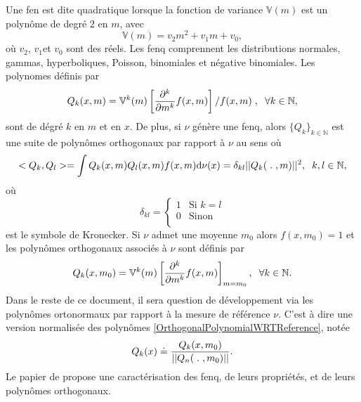 Une \gls{fen} est dite quadratique lorsque la fonction de variance $\mathbb{V}(m)$  est un polynôme de degré $2$ en $m$, avec 
\begin{equation}\label{FonctionVariance}
\mathbb{V}(m)=v_{2}m^{2}+v_{1}m+v_{0},
\end{equation}
où $v_{2}$, $v_{1}$et $v_{0}$ sont des réels. Les \gls{fenq} comprennent les distributions normales, gammas, hyperboliques, Poisson, binomiales et négative binomiales. Les polynomes définis par 
\begin{equation}\label{DefinitionPolynome}
Q_{k}(x,m)=\mathbb{V}^{k}(m)\left[\frac{\partial^{k}}{\partial m^{k}}f(x,m)\right]\left/f(x,m)\right., \hspace{0.2cm}\forall k\in \mathbb{N},
\end{equation}
sont de dégré $k$ en $m$ et en $x$. De plus, si $\nu$ génère une \gls{fenq}, alors $\{Q_{k}\}_{k\in\mathbb{N}}$ est une suite de polynômes orthogonaux par rapport à $\nu$ au sens où
\begin{equation}\label{ConditionOrthogonalitePolynome}
<Q_{k},Q_{l}>=\int Q_{k}(x,m)Q_{l}(x,m)f(x,m)\text{d}\nu(x)=\delta_{kl}||Q_{k}( \hspace{0.1cm}.\hspace{0.1cm} ,m)||^{2},\hspace{0.2cm}k,l\in\mathbb{N},
\end{equation}
où
\begin{equation} 
\delta_{kl}=
\begin{cases}
1 & \mbox{Si } k=l\\
0 & \mbox{Sinon} \\
\end{cases}
\end{equation}
est le symbole de Kronecker. Si $\nu$ admet une moyenne $m_{0}$ alors $f(x,m_{0})=1$ et les polynômes orthogonaux associés à $\nu$ sont définis par 
\begin{equation}\label{OrthogonalPolynomialWRTReference}
Q_{k}(x,m_{0})=\mathbb{V}^{k}(m)\left[\frac{\partial^{k}}{\partial m^{k}}f(x,m)\right]_{m=m_{0}}, \hspace{0.2cm}\forall k\in \mathbb{N}.
\end{equation}
Dans le reste de ce document, il sera question de développement via les polynômes ortonormaux par rapport à la mesure de référence $\nu$. C'est à dire une version normalisée des polynômes \eqref{OrthogonalPolynomialWRTReference}, notée 
\begin{equation}\label{OrthonormalPolynomialWRTReference}
Q_{k}(x)\doteq\frac{Q_{k}(x,m_{0})}{||Q_{n}(\hspace{0.1cm}.\hspace{0.1cm},m_{0})||}.
\end{equation}
Le papier de \citet{Mo82} propose une caractérisation des \gls{fenq}, de leurs propriétés, et de leurs polynômes orthogonaux.
